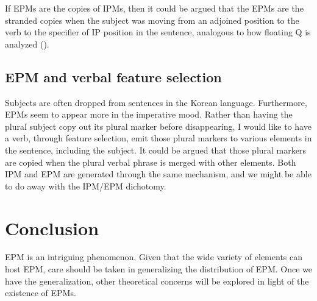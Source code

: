 \documentclass{article}
\begin{document}
If EPMs are the copies of IPMs, then it could be argued that the EPMs are the stranded copies when the subject was moving from an adjoined position to the verb to the specifier of IP position in the sentence, analogous to how floating Q is analyzed (\cite{MCC97}).

\subsection{EPM and verbal feature selection}

Subjects are often dropped from sentences in the Korean language. Furthermore, EPMs seem to appear more in the imperative mood. Rather than having the plural subject copy out its plural marker before disappearing, I would like to have a verb, through feature selection, emit those plural markers to various elements in the sentence, including the subject. It could be argued that those plural markers are copied when the plural verbal phrase is merged with other elements. Both IPM and EPM are generated through the same mechanism, and we might be able to do away with the IPM/EPM dichotomy.

\section{Conclusion}

EPM is an intriguing phenomenon. Given that the wide variety of elements can host EPM, care should be taken in generalizing the distribution of EPM. Once we have the generalization, other theoretical concerns will be explored in light of the existence of EPMs.

\singlespacing
\medskip

\end{document}
